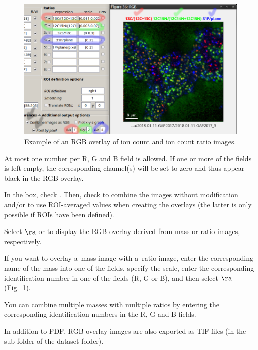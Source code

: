 \begin{figure}[!ht]
\centering
\includegraphics[scale=0.35]{figs3/LANS-rgb-overlay}
\caption{\label{fig:rgb-overlay}%
Example of an RGB overlay of ion count and ion count ratio images.}
\end{figure}

\nb
\bul At most one number per R, G and B field is allowed. If one or more of the fields is left empty, the corresponding channel(s) will be set to zero and thus appear black in the RGB overlay.

\s In the  box, check . Then, check  to combine the images without modification and/or  to use ROI-averaged values when creating the overlays (the latter is only possible if ROIs have been defined).

\s Select  $\ra$  or  to display the RGB overlay derived from mass or ratio images, respectively.

\nb
\bul If you want to overlay a~mass image with a~ratio image, enter the corresponding name of the mass into one of the  fields, specify the scale, enter the corresponding identification number in one of the  fields (R, G or B), and then select  $\ra$  (Fig.~\ref{fig:rgb-overlay}). 

\bul You can combine multiple masses with multiple ratios by entering the corresponding identification numbers in the R, G and B fields.

\bul In addition to PDF, RGB overlay images are also exported as TIF files (in the  sub-folder of the dataset folder).

